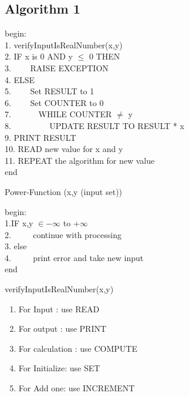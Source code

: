 \documentclass[a4paper,12pt]{article}
\begin{document}
\subsection{Algorithm 1}
\begin{algorithm}[H]
	begin: \\
	1. verifyInputIsRealNumber(x,y)\\
	2. IF x is 0 AND y $\leq$ 0 THEN \\
	3. $\hspace{2em}$RAISE EXCEPTION	\\
	4. ELSE \\
	5. $\hspace{2em}$Set RESULT to 1 \\
	6. $\hspace{2em}$Set COUNTER to 0\\
	7. $\hspace{3em}$WHILE COUNTER $\neq$ y \\
	8. $\hspace{4em}$ UPDATE RESULT TO RESULT * x\\
	9. 	PRINT RESULT \\
	10. READ new value for x and y\\
	11. REPEAT the algorithm for new value \\
	end
	\caption{Power-Function (x,y (input set))}
\end{algorithm}

\vspace{0.5cm}

\begin{algorithm}
	begin:\\
	1.IF  x,y $\in -\infty$  to  +$\infty$ \\
	2. $\hspace{2em}$ continue with processing\\
	3. else\\
	4. $\hspace{2em}$ print error and take new input \\
	end
	\caption{verifyInputIsRealNumber(x,y)}
\end{algorithm}




\begin{enumerate}
	\item For Input : use READ
	\item For output : use PRINT
	\item For calculation : use COMPUTE
	\item For Initialize: use SET 
	\item For Add one: use INCREMENT 
\end{enumerate}
\end{document}
